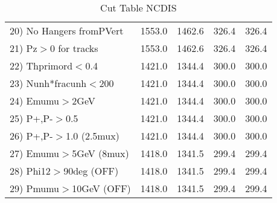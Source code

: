 \begin{table}[h!]
\begin{tabular}{||l||r|r|r|r||}
 20) No Hangers fromPVert &      1553.0 &      1462.6 &       326.4 &       326.4 \\
 21) Pz$>$0 for tracks    &      1553.0 &      1462.6 &       326.4 &       326.4 \\
 22) Thprimord$<$0.4      &      1421.0 &      1344.4 &       300.0 &       300.0 \\
 23) Nunh*fracunh$<$200   &      1421.0 &      1344.4 &       300.0 &       300.0 \\
 24) Emumu$>$2GeV         &      1421.0 &      1344.4 &       300.0 &       300.0 \\
 25) P+,P-$>$0.5          &      1421.0 &      1344.4 &       300.0 &       300.0 \\
 26) P+,P-$>$1.0 (2.5mux) &      1421.0 &      1344.4 &       300.0 &       300.0 \\
 27) Emumu$>$5GeV  (8mux) &      1418.0 &      1341.5 &       299.4 &       299.4 \\
 28) Phi12$>$90deg  (OFF) &      1418.0 &      1341.5 &       299.4 &       299.4 \\
 29) Pmumu$>$10GeV  (OFF) &      1418.0 &      1341.5 &       299.4 &       299.4 \\
 \hline
 \hline
 \end{tabular}
 \caption{Cut Table  NCDIS  }
 \label{tab-cut_ncdis}
 \end{table}
